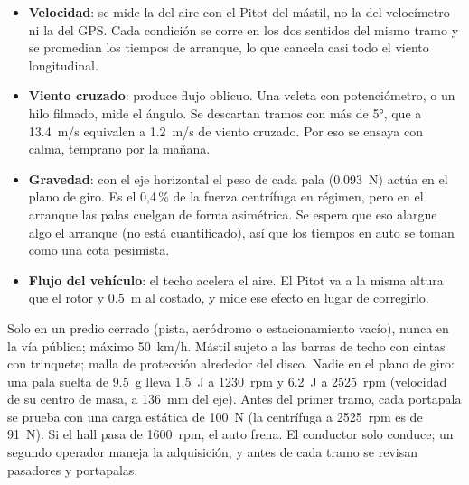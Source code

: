 \begin{itemize}
  \item \textbf{Velocidad}: se mide la del aire con el Pitot del mástil, no la del
        velocímetro ni la del GPS. Cada condición se corre en los dos sentidos del mismo
        tramo y se promedian los tiempos de arranque, lo que cancela casi todo el viento
        longitudinal.
  \item \textbf{Viento cruzado}: produce flujo oblicuo. Una veleta con potenciómetro, o
        un hilo filmado, mide el ángulo. Se descartan tramos con más de \ang{5}, que a
        \SI{13.4}{m/s} equivalen a \SI{1.2}{m/s} de viento cruzado. Por eso se ensaya
        con calma, temprano por la mañana.
  \item \textbf{Gravedad}: con el eje horizontal el peso de cada pala
        (\SI{0.093}{N}) actúa en el plano de giro. Es el 0,4\,\% de la fuerza centrífuga
        en régimen, pero en el arranque las palas cuelgan de forma asimétrica. Se espera que
        eso alargue algo el arranque (no está cuantificado), así que los tiempos en auto
        se toman como una cota pesimista.
  \item \textbf{Flujo del vehículo}: el techo acelera el aire. El Pitot va a la misma
        altura que el rotor y \SI{0.5}{m} al costado, y mide ese efecto en lugar de
        corregirlo.
\end{itemize}

\begin{nota}
Solo en un predio cerrado (pista, aeródromo o estacionamiento vacío), nunca en la vía
pública; máximo \SI{50}{km/h}. Mástil sujeto a las barras de techo con cintas con
trinquete; malla de protección alrededor del disco. Nadie en el plano de giro: una pala
suelta de \SI{9.5}{g} lleva \SI{1.5}{J} a \num{1230}~rpm y \SI{6.2}{J} a \num{2525}~rpm
(velocidad de su centro de masa, a \SI{136}{mm} del eje). Antes del primer tramo, cada
portapala se prueba con una carga estática de \SI{100}{N} (la centrífuga a \num{2525}~rpm es de \SI{91}{N}).
Si el hall pasa de \num{1600}~rpm, el auto frena. El conductor solo conduce; un
segundo operador maneja la adquisición, y antes de cada tramo se revisan pasadores y
portapalas.
\end{nota}


